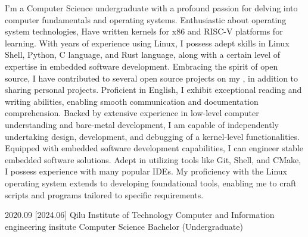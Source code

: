 \documentclass[zh]{resume}
\begin{document}
\makeheader

{\onehalfspacing\hspace{2em}%
I'm a Computer Science undergraduate with a profound passion for delving into computer fundamentals and operating systems. Enthusiastic about operating system technologies, Have written kernels for x86 and RISC-V platforms for learning. With years of experience using Linux, I possess adept skills in Linux Shell, Python, C language, and Rust language, along with a certain level of expertise in embedded software development. Embracing the spirit of open source, I have contributed to several open source projects on my , in addition to sharing personal projects. Proficient in English, I exhibit exceptional reading and writing abilities, enabling smooth communication and documentation comprehension. 
Backed by extensive experience in low-level computer understanding and bare-metal development, I am capable of independently undertaking design, development, and debugging of a kernel-level functionalities. Equipped with embedded software development capabilities, I can engineer stable embedded software solutions. Adept in utilizing tools like Git, Shell, and CMake, I possess experience with many popular IDEs. My proficiency with the Linux operating system extends to developing foundational tools, enabling me to craft scripts and programs tailored to specific requirements.

\par}



\begin{educations}
  \education%
    {2020.09}%
    [2024.06]%
    {Qilu Institute of Technology}%
    {Computer and Information engineering insitute}%
    {Computer Science}%
    {Bachelor (Undergraduate)}
\end{educations}
\end{document}
